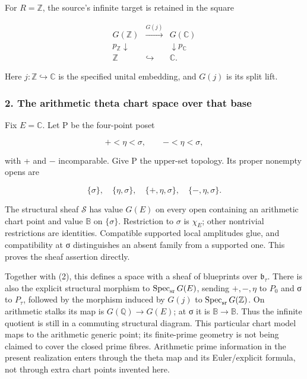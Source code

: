 For \(R=\mathbb Z\), the source's infinite target is retained in the square

\[
\begin{array}{ccc}
G(\mathbb Z)&\xrightarrow{G(j)}&G(\mathbb C)\\
p_{\mathbb Z}\downarrow&&\downarrow p_{\mathbb C}\\
\mathbb Z&\hookrightarrow&\mathbb C.
\end{array}
\tag{8}
\]

Here \(j:\mathbb Z\hookrightarrow\mathbb C\) is the specified unital embedding, and \(G(j)\) is its split lift.

\subsubsection{2. The arithmetic theta chart space over that base}\label{endpoint-tau_base--the-arithmetic-theta-chart-space-over-that-base}

Fix \(E=\mathbb C\). Let P be the four-point poset

\[
+<\eta<\sigma,\qquad -<\eta<\sigma,
\tag{9}
\]

with + and − incomparable. Give P the upper-set topology. Its proper nonempty opens are

\[
\{\sigma\},\quad\{\eta,\sigma\},\quad
\{+,\eta,\sigma\},\quad\{-,\eta,\sigma\}.
\]

The structural sheaf \(\mathcal S\) has value \(G(E)\) on every open containing an arithmetic chart point and value \(\mathbb B\) on \(\{\sigma\}\). Restriction to \(\sigma\) is \(\chi_E\); other nontrivial restrictions are identities. Compatible supported local amplitudes glue, and compatibility at σ distinguishes an absent family from a supported one. This proves the sheaf assertion directly.

Together with (2), this defines a space with a sheaf of blueprints over \(\mathfrak b_\tau\). There is also the explicit structural morphism to \(\operatorname{Spec}_{\rm sr}G(E)\), sending \(+, -,\eta\) to \(P_0\) and σ to \(P_\tau\), followed by the morphism induced by \(G(j)\) to \(\operatorname{Spec}_{\rm sr}G(\mathbb Z)\). On arithmetic stalks its map is \(G(\mathbb Q)\to G(E)\); at σ it is \(\mathbb B\to\mathbb B\). Thus the infinite quotient is still in a commuting structural diagram. This particular chart model maps to the arithmetic generic point; its finite-prime geometry is not being claimed to cover the closed prime fibres. Arithmetic prime information in the present realization enters through the theta map and its Euler/explicit formula, not through extra chart points invented here.

